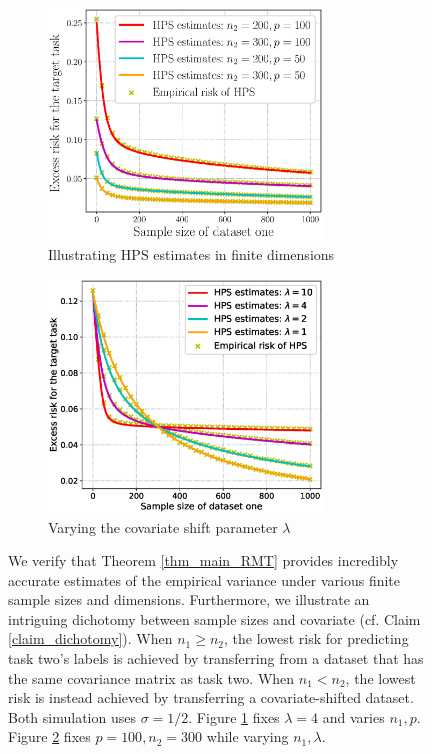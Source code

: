 \begin{figure}[!t]
	\begin{subfigure}[b]{0.5\textwidth}
		\centering
		\includegraphics[width=0.8\textwidth]{figures/verify_covariate_shift.eps}
		\caption{Illustrating HPS estimates in finite dimensions}
		\label{fig_sec3_verify_cov}
	\end{subfigure}
	\begin{subfigure}[b]{0.5\textwidth}
		\centering
		\includegraphics[width=0.8\textwidth]{figures/covariate_shift.eps}
		\caption{Varying the covariate shift parameter $\lambda$}
		\label{fig_sec3_covariate}
	\end{subfigure}
	\caption{We verify that Theorem \ref{thm_main_RMT} provides incredibly accurate estimates of the empirical variance under various finite sample sizes and dimensions.
	Furthermore, we illustrate an intriguing dichotomy between sample sizes and covariate (cf. Claim \ref{claim_dichotomy}).
	When $n_1 \ge n_2$, the lowest risk for predicting task two's labels is achieved by transferring from a dataset that has the same covariance matrix as task two. 
	When $n_1 < n_2$, the lowest risk is instead achieved by transferring a covariate-shifted dataset.
	Both simulation uses $\sigma = 1/2$.
	Figure \ref{fig_sec3_verify_cov} fixes $\lambda = 4$ and varies $n_1, p$.
	Figure \ref{fig_sec3_covariate} fixes $p = 100, n_2 = 300$ while varying $n_1, \lambda$.}
	\label{fig_sec31}
\end{figure}

